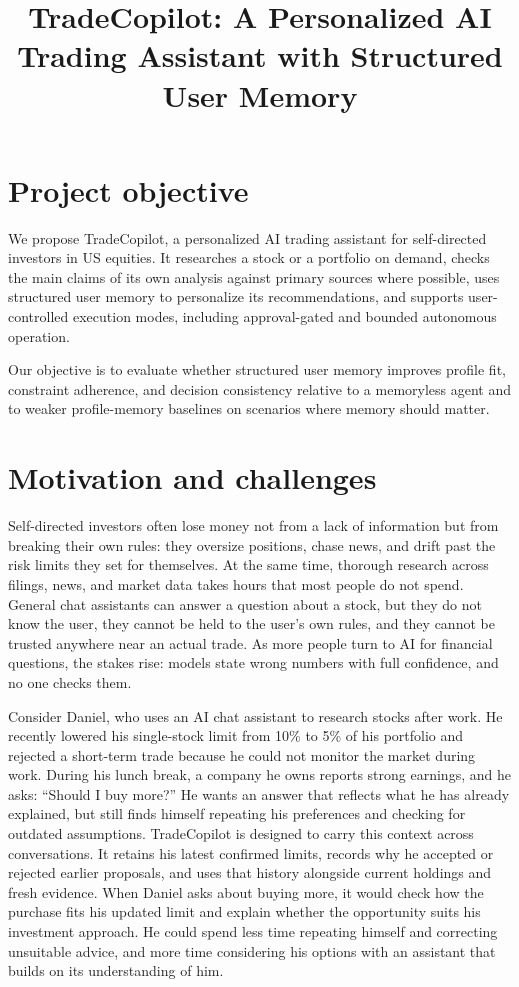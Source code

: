 \documentclass{article}
\title{TradeCopilot: A Personalized AI Trading Assistant with Structured User Memory}
\begin{document}
\maketitle

\section{Project objective}

We propose TradeCopilot, a personalized AI trading assistant for self-directed investors in US
equities. It researches a stock or a portfolio on demand, checks the main claims of its own
analysis against primary sources where possible, uses structured user memory to personalize its
recommendations, and supports user-controlled execution modes, including approval-gated and
bounded autonomous operation.

Our objective is to evaluate whether structured user memory improves profile fit, constraint
adherence, and decision consistency relative to a memoryless agent and to weaker profile-memory
baselines on scenarios where memory should matter.

\section{Motivation and challenges}

Self-directed investors often lose money not from a lack of information but from breaking their
own rules: they oversize positions, chase news, and drift past the risk limits they set for
themselves. At the same time, thorough research across filings, news, and market data
takes hours that most people do not spend. General chat assistants can answer a question about a
stock, but they do not know the user, they cannot be held to the user's own rules, and they cannot
be trusted anywhere near an actual trade. As more people turn to AI for financial questions, the
stakes rise: models state wrong numbers with full confidence, and no one checks them.

Consider Daniel, who uses an AI chat assistant to research stocks after work. He recently
lowered his single-stock limit from 10\% to 5\% of his portfolio and rejected a short-term
trade because he could not monitor the market during work. During his lunch break, a company
he owns reports strong earnings, and he asks: ``Should I buy more?'' He wants an answer that
reflects what he has already explained, but still finds himself repeating his preferences
and checking for outdated assumptions. TradeCopilot is designed to carry this context across
conversations. It retains his latest confirmed limits, records why he accepted or rejected
earlier proposals, and uses that history alongside current holdings and fresh evidence.
When Daniel asks about buying more, it would check how the purchase fits his updated limit
and explain whether the opportunity suits his investment approach. He could spend less time
repeating himself and correcting unsuitable advice, and more time considering his options
with an assistant that builds on its understanding of him.
\end{document}
